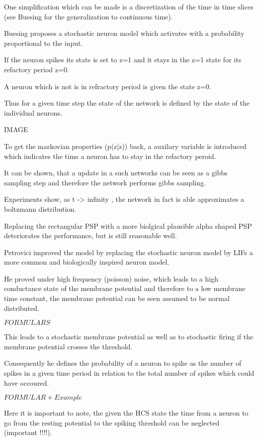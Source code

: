 One simplification which can be made is a discretization of the time in time slices (see Buesing for the generalization to continuous time).

Buesing proposes a stochastic neuron model which activates with a probability proportional to the input.

If the neuron spikes its state is set to z=1 and it stays in the z=1 state for its refactory period z=0. 

A neuron which is not is in refractory period is given the state z=0. 

Thus for a given time step the state of the network is defined by the state of the individual neurons. 

IMAGE

To get the markovian properties (p(z|z)) back, a auxilary variable is introduced which indicates the time a neuron has to stay in the refactory peroid.

It can be shown, that a update in a such networks can be seen as a gibbs sampling step and therefore the network performs gibbs sampling.

Experiments show, as t -> infinity , the network in fact is able approximates a boltzmann distribution.

Replacing the rectangular PSP with a more biolgical plausible alpha shaped PSP deteriorates the performance, but is still reasonable well.

Petrovici improved the model by replacing the stochastic neuron model by LIFs a more common and biologically inspired neuron model.

He proved under high frequency (poisson) noise, which leads to a high conductance state of the membrane potential and therefore to a low membrane time constant, the membrane potential can be seen assumed to be normal distributed.

$FORMULARS$

This leads to a stochastic membrane potential as well as to stochastic firing if the membrane potential crosses the threshold.

Consequently he defines the probability of a neuron to spike as the number of spikes in a given time period in relation to the total number of spikes which could have occoured. 

$FORMULAR + Example$

Here it is important to note, the given the HCS state the time from a neuron to go from the resting potential to the spiking threshold can be neglected (important !!!!).

